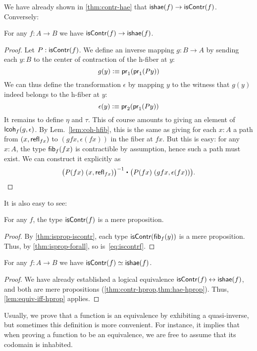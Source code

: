 We have already shown in \autoref{thm:contr-hae} that $\mathsf{ishae}(f) \to \mathsf{isContr}(f)$.
Conversely:

\begin{thm}\label{thm:lequiv-contr-hae}
For any $f:A\to B$ we have ${\mathsf{isContr}(f)} \to {\ensuremath{\mathsf{ishae}}(f)}$.
\end{thm}
\begin{proof}
Let $P : \mathsf{isContr}(f)$. We define an inverse mapping $g : B \to A$ by sending each $y : B$ to the center of contraction of the h-fiber at $y$:
\[ g(y) \vcentcolon\equiv \mathsf{pr}_{1}(\mathsf{pr}_{1}(Py)) \]
We can thus define the transformation $\epsilon$ by mapping $y$ to the witness that $g(y)$ indeed belongs to the h-fiber at $y$:
\[ \epsilon(y) \vcentcolon\equiv \mathsf{pr}_{2}(\mathsf{pr}_{1}(P y)) \]
It remains to define $\eta$ and $\tau$. This of course amounts to giving an element of $\mathsf{lcoh}_{f}(g,\epsilon)$. By Lem.~\ref{lem:coh-hfib}, this is the same as giving for each $x:A$ a path from $(x,\mathsf{refl}_{fx})$ to $(gfx,\epsilon(fx))$ in the fiber at $fx$. But this is easy: for any $x : A$, the type $\mathsf{fib}_{f}(fx)$ 
is contractible by assumption, hence such a path must exist. We can construct it explicitly as
\[\opp{\big(P(fx) \; (x,\refl{fx})\big)} \ct \big(P(fx) \; (gfx,\epsilon(fx))\big). \qedhere \]
\end{proof}

It is also easy to see:

\begin{lem}\label{thm:contr-hprop}
  For any $f$, the type $\mathsf{isContr}(f)$ is a mere proposition.
\end{lem}
\begin{proof}
  By \autoref{thm:isprop-iscontr}, each type $\mathsf{isContr} (\mathsf{fib}_{f}(y))$ is a mere proposition.
  Thus, by \autoref{thm:isprop-forall}, so is~\eqref{eq:iscontrf}.
\end{proof}

\begin{thm}\label{thm:equiv-contr-hae}
  For any $f:A\to B$ we have $\mathsf{isContr}(f) \simeq \mathsf{ishae}(f)$.
\end{thm}
\begin{proof}
  We have already established a logical equivalence ${\mathsf{isContr}(f)} \leftrightarrow {\ensuremath{\mathsf{ishae}}(f)}$, and both are mere propositions (\cref{thm:contr-hprop,thm:hae-hprop}).
  Thus, \autoref{lem:equiv-iff-hprop} applies.
\end{proof}

Usually, we prove that a function is an equivalence by exhibiting a quasi-inverse, but sometimes this definition is more convenient.
For instance, it implies that when proving a function to be an equivalence, we are free to assume that its codomain is inhabited.

